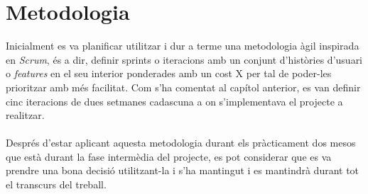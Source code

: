 
\chapter{Metodologia} %

\label{Chapter4} %

Inicialment es va planificar utilitzar i dur a terme una metodologia àgil inspirada en \textit{Scrum}, és a dir, definir sprints o iteracions amb un conjunt d'històries d'usuari o \textit{features} en el seu interior ponderades amb un cost X per tal de poder-les prioritzar amb més facilitat. Com s'ha comentat al capítol anterior, es van definir cinc iteracions de dues setmanes cadascuna a on s'implementava el projecte a realitzar.
\\\\
Després d'estar aplicant aquesta metodologia durant els pràcticament dos mesos que està durant la fase intermèdia del projecte, es pot considerar que es va prendre una bona decisió utilitzant-la i s'ha mantingut i es mantindrà durant tot el transcurs del treball.